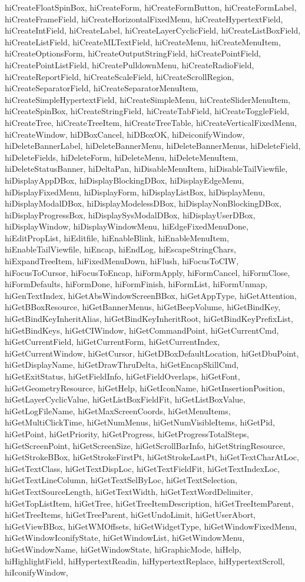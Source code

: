 {{hiCreateFloatSpinBox, hiCreateForm, hiCreateFormButton, hiCreateFormLabel, hiCreateFrameField, hiCreateHorizontalFixedMenu, hiCreateHypertextField, hiCreateIntField, hiCreateLabel, hiCreateLayerCyclicField, hiCreateListBoxField, hiCreateListField, hiCreateMLTextField, hiCreateMenu, hiCreateMenuItem, hiCreateOptionsForm, hiCreateOutputStringField, hiCreatePointField, hiCreatePointListField, hiCreatePulldownMenu, hiCreateRadioField, hiCreateReportField, hiCreateScaleField, hiCreateScrollRegion, hiCreateSeparatorField, hiCreateSeparatorMenuItem, hiCreateSimpleHypertextField, hiCreateSimpleMenu, hiCreateSliderMenuItem, hiCreateSpinBox, hiCreateStringField, hiCreateTabField, hiCreateToggleField, hiCreateTree, hiCreateTreeItem, hiCreateTreeTable, hiCreateVerticalFixedMenu, hiCreateWindow, hiDBoxCancel, hiDBoxOK, hiDeiconifyWindow, hiDeleteBannerLabel, hiDeleteBannerMenu, hiDeleteBannerMenus, hiDeleteField, hiDeleteFields, hiDeleteForm, hiDeleteMenu, hiDeleteMenuItem, hiDeleteStatusBanner, hiDeltaPan, hiDisableMenuItem, hiDisableTailViewfile, hiDisplayAppDBox, hiDisplayBlockingDBox, hiDisplayEdgeMenu, hiDisplayFixedMenu, hiDisplayForm, hiDisplayListBox, hiDisplayMenu, hiDisplayModalDBox, hiDisplayModelessDBox, hiDisplayNonBlockingDBox, hiDisplayProgressBox, hiDisplaySysModalDBox, hiDisplayUserDBox, hiDisplayWindow, hiDisplayWindowMenu, hiEdgeFixedMenuDone, hiEditPropList, hiEditfile, hiEnableBlink, hiEnableMenuItem, hiEnableTailViewfile, hiEncap, hiEndLog, hiEscapeStringChars, hiExpandTreeItem, hiFixedMenuDown, hiFlush, hiFocusToCIW, hiFocusToCursor, hiFocusToEncap, hiFormApply, hiFormCancel, hiFormClose, hiFormDefaults, hiFormDone, hiFormFinish, hiFormList, hiFormUnmap, hiGenTextIndex, hiGetAbsWindowScreenBBox, hiGetAppType, hiGetAttention, hiGetBBoxResource, hiGetBannerMenus, hiGetBeepVolume, hiGetBindKey, hiGetBindKeyInheritAlias, hiGetBindKeyInheritRoot, hiGetBindKeyPrefixList, hiGetBindKeys, hiGetCIWindow, hiGetCommandPoint, hiGetCurrentCmd, hiGetCurrentField, hiGetCurrentForm, hiGetCurrentIndex, hiGetCurrentWindow, hiGetCursor, hiGetDBoxDefaultLocation, hiGetDbuPoint, hiGetDisplayName, hiGetDrawThruDelta, hiGetEncapSkillCmd, hiGetExitStatus, hiGetFieldInfo, hiGetFieldOverlaps, hiGetFont, hiGetGeometryResource, hiGetHelp, hiGetIconName, hiGetInsertionPosition, hiGetLayerCyclicValue, hiGetListBoxFieldFit, hiGetListBoxValue, hiGetLogFileName, hiGetMaxScreenCoords, hiGetMenuItems, hiGetMultiClickTime, hiGetNumMenus, hiGetNumVisibleItems, hiGetPid, hiGetPoint, hiGetPriority, hiGetProgress, hiGetProgressTotalSteps, hiGetScreenPoint, hiGetScreenSize, hiGetScrollBarInfo, hiGetStringResource, hiGetStrokeBBox, hiGetStrokeFirstPt, hiGetStrokeLastPt, hiGetTextCharAtLoc, hiGetTextClass, hiGetTextDispLoc, hiGetTextFieldFit, hiGetTextIndexLoc, hiGetTextLineColumn, hiGetTextSelByLoc, hiGetTextSelection, hiGetTextSourceLength, hiGetTextWidth, hiGetTextWordDelimiter, hiGetTopListItem, hiGetTree, hiGetTreeItemDescription, hiGetTreeItemParent, hiGetTreeItems, hiGetTreeParent, hiGetUndoLimit, hiGetUserAbort, hiGetViewBBox, hiGetWMOffsets, hiGetWidgetType, hiGetWindowFixedMenu, hiGetWindowIconifyState, hiGetWindowList, hiGetWindowMenu, hiGetWindowName, hiGetWindowState, hiGraphicMode, hiHelp, hiHighlightField, hiHypertextReadin, hiHypertextReplace, hiHypertextScroll, hiIconifyWindow, }}
